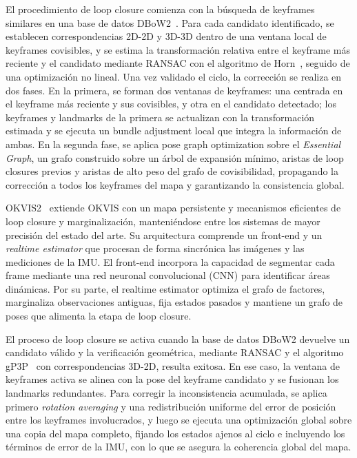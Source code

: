 El procedimiento de loop closure comienza con la búsqueda de keyframes similares en una base de datos DBoW2~\cite{galvezlopez2012dbow2}. Para cada candidato identificado, se establecen correspondencias 2D-2D y 3D-3D dentro de una ventana local de keyframes covisibles, y se estima la transformación relativa entre el keyframe más reciente y el candidato mediante RANSAC con el algoritmo de Horn~\cite{horn1987algorithm}, seguido de una optimización no lineal. Una vez validado el ciclo, la corrección se realiza en dos fases. En la primera, se forman dos ventanas de keyframes: una centrada en el keyframe más reciente y sus covisibles, y otra en el candidato detectado; los keyframes y landmarks de la primera se actualizan con la transformación estimada y se ejecuta un bundle adjustment local que integra la información de ambas. En la segunda fase, se aplica pose graph optimization sobre el \textit{Essential Graph}, un grafo construido sobre un árbol de expansión mínimo, aristas de loop closures previos y aristas de alto peso del grafo de covisibilidad, propagando la corrección a todos los keyframes del mapa y garantizando la consistencia global.

OKVIS2~\cite{leutenegger2022okvis2} extiende OKVIS con un mapa persistente y mecanismos eficientes de loop closure y marginalización, manteniéndose entre los sistemas de mayor precisión del estado del arte. Su arquitectura comprende un front-end y un \textit{realtime estimator} que procesan de forma sincrónica las imágenes y las mediciones de la IMU. El front-end incorpora la capacidad de segmentar cada frame mediante una red neuronal convolucional (CNN) para identificar áreas dinámicas. Por su parte, el realtime estimator optimiza el grafo de factores, marginaliza observaciones antiguas, fija estados pasados y mantiene un grafo de poses que alimenta la etapa de loop closure.

El proceso de loop closure se activa cuando la base de datos DBoW2 devuelve un candidato válido y la verificación geométrica, mediante RANSAC y el algoritmo gP3P~\cite{kneip2013gpnp} con correspondencias 3D-2D, resulta exitosa. En ese caso, la ventana de keyframes activa se alinea con la pose del keyframe candidato y se fusionan los landmarks redundantes. Para corregir la inconsistencia acumulada, se aplica primero \textit{rotation averaging} y una redistribución uniforme del error de posición entre los keyframes involucrados, y luego se ejecuta una optimización global sobre una copia del mapa completo, fijando los estados ajenos al ciclo e incluyendo los términos de error de la IMU, con lo que se asegura la coherencia global del mapa.

